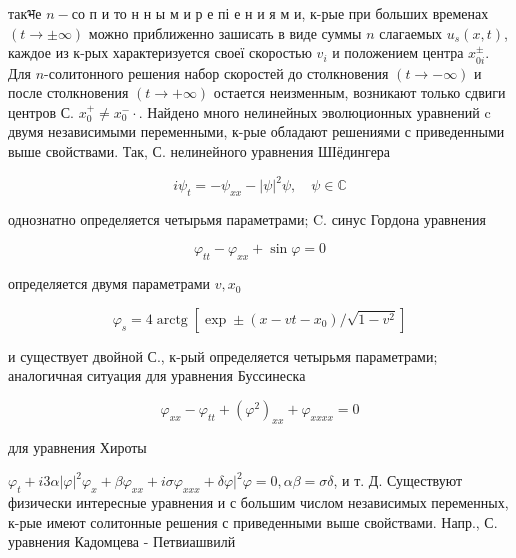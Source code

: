 \documentclass[10pt]{article}
\begin{document}
такभе $n-с о$ п и то н н ы м и р е пі е н и я м и, к-рые при больших временах $(t \rightarrow \pm \infty)$ можно приближенно зашисать в виде суммы $n$ слагаемых $u_{s}(x, t)$, каждое из к-рых характеризуется своеї скоростью $v_{i}$ и положением центра $x_{0 i}^{ \pm}$. Для $n$-солитонного решения набор скоростей до столкновения $(t \rightarrow-\infty)$ и после столкновения $(t \rightarrow+\infty)$ остается неизменным, возникают только сдвиги центров С. $x_{0}^{+} \neq x_{0}^{-} \cdot$. Найдено много нелинейных эволюционных уравнений c двумя независимыми переменными, к-рые обладают решениями с приведенными выше свойствами. Так, С. нелинейного уравнения ШІёдингера



\[

i \psi_{t}=-\psi_{x x}-|\psi|^{2} \psi, \quad \psi \in \mathbb{C}

\]



однознатно определяется четырьмя параметрами; C. синус Гордона уравнения



\[

\varphi_{t t}-\varphi_{x x}+\sin \varphi=0

\]



определяется двумя параметрами $v, x_{0}$



\[

\varphi_{s}=4 \operatorname{arctg}\left[\exp \pm\left(x-v t-x_{0}\right) / \sqrt{1-v^{2}}\right]

\]



и существует двойной С., к-рый определяется четырьмя параметрами; аналогичная ситуация для уравнения Буссинеска



\[

\varphi_{x x}-\varphi_{t t}+\left(\varphi^{2}\right)_{x x}+\varphi_{x x x x}=0

\]



для уравнения Хироты



$\varphi_{t}+i 3 \alpha|\varphi|^{2} \varphi_{x}+\beta \varphi_{x x}+i \sigma \varphi_{x x x}+\left.\delta \varphi\right|^{2} \varphi=0, \alpha \beta=\sigma \delta$, и т. Д. Существуют физически интересные уравнения и с большим числом независимых переменных, к-рые имеют солитонные решения с приведенными выше свойствами. Напр., С. уравнения Кадомцева - Петвиашвилй
\end{document}
